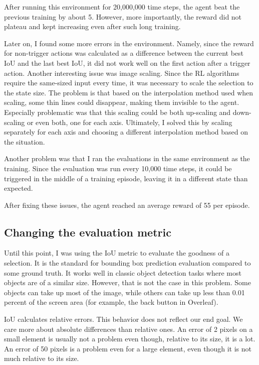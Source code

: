 \documentclass[
  digital,     %
  oneside,     %
  nosansbold,  %
  nocolorbold, %
  lof,         %
  lot,         %
]{fithesis4}
\begin{document}
After running this environment for 20,000,000 time steps, the agent beat the previous training by about 5. However, more importantly, the reward did not plateau and kept increasing even after such long training.

Later on, I found some more errors in the environment. Namely, since the reward for non-trigger actions was calculated as a difference between the current best IoU and the last best IoU, it did not work well on the first action after a trigger action.
Another interesting issue was image scaling. Since the RL algorithms require the same-sized input every time, it was necessary to scale the selection to the state size. The problem is that based on the interpolation method used when scaling, some thin lines could disappear, making them invisible to the agent. Especially problematic was that this scaling could be both up-scaling and down-scaling or even both, one for each axis. Ultimately, I solved this by scaling separately for each axis and choosing a different interpolation method based on the situation.

Another problem was that I ran the evaluations in the same environment as the training. Since the evaluation was run every 10,000 time steps, it could be triggered in the middle of a training episode, leaving it in a different state than expected.

After fixing these issues, the agent reached an average reward of 55 per episode.

\subsection{Changing the evaluation metric}

Until this point, I was using the IoU metric to evaluate the goodness of a selection. It is the standard for bounding box prediction evaluation compared to some ground truth. It works well in classic object detection tasks where most objects are of a similar size. However, that is not the case in this problem. Some objects can take up most of the image, while others can take up less than 0.01 percent of the screen area (for example, the back button in Overleaf).

IoU calculates relative errors. This behavior does not reflect our end goal. We care more about absolute differences than relative ones. An error of 2 pixels on a small element is usually not a problem even though, relative to its size, it is a lot. An error of 50 pixels is a problem even for a large element, even though it is not much relative to its size.
\end{document}
